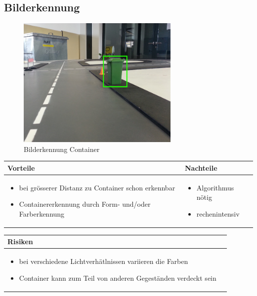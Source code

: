 \pagebreak


\subsection{Bilderkennung}
\begin{figure}[h!]%
\centering
\includegraphics[width=0.7\textwidth]{fig/containererkennung_grob_bilderkennung.png}
\caption{Bilderkennung Container}
\label{fig:Bilderkennung Container}
\end{figure}

\begin{table}[h]
\begin{tabular}{p{} | p{}}


\textbf{Vorteile} & \textbf{Nachteile} \\ \hline
	 
\begin{itemize}
\item bei grösserer Distanz zu Container schon erkennbar
\item Containererkennung durch Form- und/oder Farberkennung
\end{itemize}

 
 &
 
\begin{itemize}
\item Algorithmus nötig
\item rechenintensiv
\end{itemize}

\end{tabular}
\end{table}

\begin{table}[h]
\begin{tabular}{p{}p{}}

\textbf{Risiken} & \\ \hline
	 
\begin{itemize}
\item bei verschiedene Lichtverhätlnissen variieren die Farben
\item Container kann zum Teil von anderen Gegeständen verdeckt sein
\end{itemize}

 
\end{tabular}
\end{table}

\pagebreak